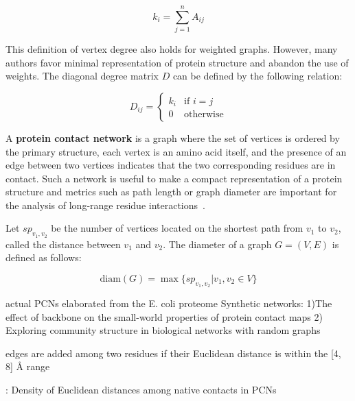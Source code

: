         \begin{equation}
            k_i = \sum\limits_{j=1}^{n} A_{ij}
        \end{equation}

        This definition of vertex degree also holds for weighted graphs. However, many authors favor minimal representation of protein structure
        and abandon the use of weights. The diagonal degree matrix $D$ can be defined by the following relation:

        \begin{equation}    
            D_{ij} =
                \begin{cases}
                    k_i & \text{if } i = j \\
                    0 & \text{otherwise}
                \end{cases}       
        \end{equation}

        A \textbf{protein contact network} is a graph where the set of vertices is ordered by the primary structure, each vertex is an amino acid itself,
        and the presence of an edge between two vertices indicates that the two corresponding residues are in contact. Such a network is useful to make a compact 
        representation of a protein structure and metrics such as path length or graph diameter are important for the analysis of long-range residue
        interactions~\cite{doi:10.1021/cr3002356}.

        Let $sp_{v_1,v_2}$ be the number of vertices located on the shortest path from $v_1$ to $v_2$, called the distance between $v_1$ and $v_2$.
        The diameter of a graph $G = (V, E)$ is defined as follows:

        \begin{equation}
            \text{diam}(G) = \max \{ sp_{v_1, v_2} | v_1, v_2 \in V \}
        \end{equation}


        \cite{doi:10.1080/07391102.2015.1077736}
        actual PCNs elaborated from the E. coli proteome 
        Synthetic networks:
        1)The effect of backbone on the small-world properties of protein contact maps
        2) Exploring community structure in biological networks with random graphs

        edges are added among two residues if their Euclidean distance is within the [4, 8] \AA{} range

        : Density of Euclidean distances among native contacts in PCNs

